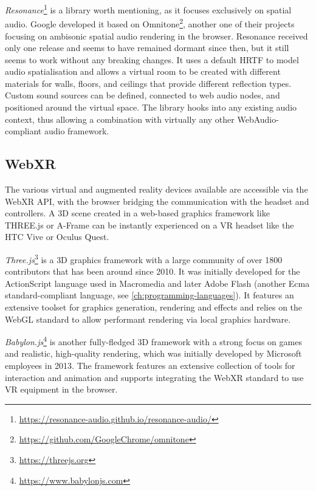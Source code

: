 \emph{Resonance}\footnote{\url{https://resonance-audio.github.io/resonance-audio/}} is a library worth mentioning, as it focuses exclusively on spatial audio.
Google developed it based on Omnitone\footnote{\url{https://github.com/GoogleChrome/omnitone}}, another one of their projects focusing on ambisonic spatial audio rendering in the browser.
Resonance received only one release and seems to have remained dormant since then, but it still seems to work without any breaking changes.
It uses a default \ac{HRTF} to model audio spatialisation and allows a virtual room to be created with different materials for walls, floors, and ceilings that provide different reflection types.
Custom sound sources can be defined, connected to web audio nodes, and positioned around the virtual space.
The library hooks into any existing audio context, thus allowing a combination with virtually any other WebAudio-compliant audio framework.

\subsection{WebXR}

The various virtual and augmented reality devices available are accessible via the \ac{WebXR} \ac{API}, with the browser bridging the communication with the headset and controllers. A \ac{3D} scene created in a web-based graphics framework like THREE.js or A-Frame can be instantly experienced on a \ac{VR} headset like the HTC Vive or Oculus Quest.



\emph{Three.js}\footnote{\url{https://threejs.org}} is a \ac{3D} graphics framework with a large community of over 1800 contributors that has been around since 2010.
It was initially developed for the ActionScript language used in Macromedia and later Adobe Flash (another Ecma standard-compliant language, see \autoref{ch:programming-languages}).
It features an extensive toolset for graphics generation, rendering and effects and relies on the WebGL standard to allow performant rendering via local graphics hardware.

\emph{Babylon.js}\footnote{\url{https://www.babylonjs.com}} is another fully-fledged \ac{3D} framework with a strong focus on games and realistic, high-quality rendering, which was initially developed by Microsoft employees in 2013.
The framework features an extensive collection of tools for interaction and animation and supports integrating the \ac{WebXR} standard to use \ac{VR} equipment in the browser.


